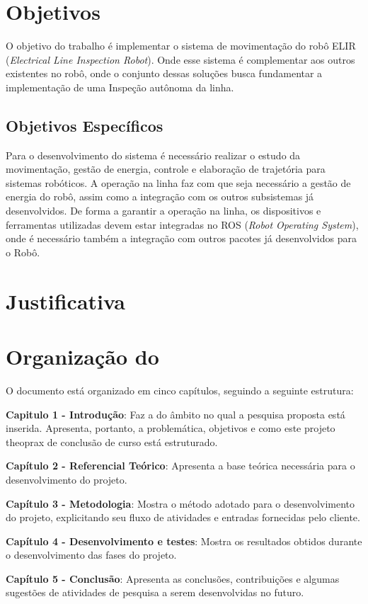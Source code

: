 \section{Objetivos}
\label{sec:obj}
O objetivo do trabalho é implementar o sistema de movimentação do robô ELIR (\textit{Electrical Line Inspection Robot}). Onde esse sistema é complementar aos outros existentes no robô, onde o conjunto dessas soluções busca fundamentar a implementação de uma Inspeção autônoma da linha.


\subsection{Objetivos Específicos}
\label{ssec:objesp}
Para o desenvolvimento do sistema é necessário realizar o estudo da movimentação, gestão de energia, controle e elaboração de trajetória para sistemas robóticos. A operação na linha faz com que seja necessário a gestão de energia do robô, assim como a integração com os outros subsistemas já desenvolvidos. De forma a garantir a operação na linha, os dispositivos e ferramentas utilizadas devem estar integradas no ROS (\textit{Robot Operating System}), onde é necessário também a integração com outros pacotes já desenvolvidos para o Robô.

\section{Justificativa}
\label{sec:justi}


\section{Organização do \thetypework}
\label{section:organizacao}
O documento está organizado em cinco capítulos, seguindo a seguinte estrutura:

\textbf{Capitulo 1 - Introdução}: Faz a   do âmbito no qual a pesquisa proposta está inserida. Apresenta, portanto, a problemática, objetivos e como este projeto theoprax de conclusão de curso está estruturado.

\textbf{Capítulo 2 - Referencial Teórico}: Apresenta a base teórica necessária para o desenvolvimento do projeto.

\textbf{Capítulo 3 - Metodologia}: Mostra o método adotado para o desenvolvimento do projeto, explicitando seu fluxo de atividades e entradas fornecidas pelo cliente.

\textbf{Capítulo 4 - Desenvolvimento e testes}: Mostra os resultados obtidos durante o desenvolvimento das fases do projeto.

\textbf{Capítulo 5 - Conclusão}: Apresenta as conclusões, contribuições e algumas sugestões de atividades de pesquisa a serem desenvolvidas no futuro.


